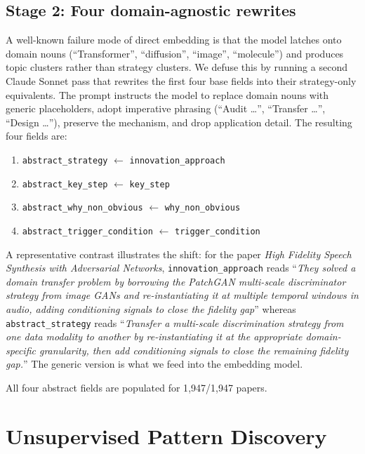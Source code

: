 \documentclass[10pt,a4paper]{article}
\begin{document}
\subsection{Stage 2: Four domain-agnostic rewrites}

A well-known failure mode of direct embedding is that the model latches onto domain nouns (``Transformer'', ``diffusion'', ``image'', ``molecule'') and produces topic clusters rather than strategy clusters. We defuse this by running a second Claude Sonnet pass that rewrites the first four base fields into their strategy-only equivalents. The prompt instructs the model to replace domain nouns with generic placeholders, adopt imperative phrasing (``Audit \ldots'', ``Transfer \ldots'', ``Design \ldots''), preserve the mechanism, and drop application detail. The resulting four fields are:

\begin{enumerate}[nosep, leftmargin=1.5em]
\item \texttt{abstract\_strategy} $\leftarrow$ \texttt{innovation\_approach}
\item \texttt{abstract\_key\_step} $\leftarrow$ \texttt{key\_step}
\item \texttt{abstract\_why\_non\_obvious} $\leftarrow$ \texttt{why\_non\_obvious}
\item \texttt{abstract\_trigger\_condition} $\leftarrow$ \texttt{trigger\_condition}
\end{enumerate}

A representative contrast illustrates the shift: for the paper \emph{High Fidelity Speech Synthesis with Adversarial Networks}, \texttt{innovation\_approach} reads ``\textit{They solved a domain transfer problem by borrowing the PatchGAN multi-scale discriminator strategy from image GANs and re-instantiating it at multiple temporal windows in audio, adding conditioning signals to close the fidelity gap}'' whereas \texttt{abstract\_strategy} reads ``\textit{Transfer a multi-scale discrimination strategy from one data modality to another by re-instantiating it at the appropriate domain-specific granularity, then add conditioning signals to close the remaining fidelity gap.}'' The generic version is what we feed into the embedding model.

All four abstract fields are populated for 1{,}947/1{,}947 papers.


\section{Unsupervised Pattern Discovery}
\label{sec:clustering}
\end{document}
